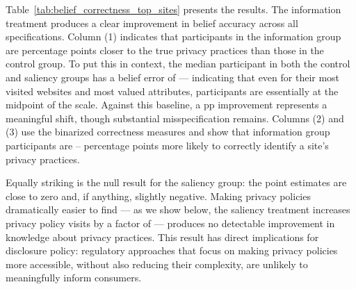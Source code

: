 \documentclass[12pt]{article}
\theoremstyle{definition}
\theoremstyle{remark}
\begin{document}
\begin{table}[ht]
   \caption{Belief Correctness on Top Sites -- Provided Information}\label{tab:belief_correctness_top_sites}
   \centering
   \scalebox{0.8}{
   
   }
   \caption*{\scriptsize \textsc{Notes}:  OLS estimates from Equation~\eqref{eq:belief_correctness}. Includes website and randomization block fixed effects. Column (1): Dependent variable is $|\text{Belief}_{ijk} - \text{Truth}_{jk}|$, where beliefs are scaled to $\{0, 25, 50, 75, 100\}$ and truth is binary $\{0, 100\}$. Column (2): Binary indicator equal to 1 if response is correct, excluding neutral responses of 50. Column (3): Strict correctness, equal to 1 if $(\text{Belief} > 50) = (\text{Truth} = 100)$. The beliefs are the likelihood of the website engaging in the specified privacy practice for the top 5 most visited sites during the intervention and for the top 2 most informative attributes according to Equation \eqref{eq:provided_info}.}
\end{table}

Table~\ref{tab:belief_correctness_top_sites} presents the results. The information treatment produces a clear improvement in belief accuracy across all specifications. Column (1) indicates that participants in the information group are \beliefDistanceInfoPP{} percentage points closer to the true privacy practices than those in the control group. To put this in context, the median participant in both the control and saliency groups has a belief error of \beliefErrorMedianBaseline{} --- indicating that even for their most visited websites and most valued attributes, participants are essentially at the midpoint of the scale. Against this baseline, a \beliefDistanceInfoPP{} pp improvement represents a meaningful shift, though substantial misspecification remains. Columns (2) and (3) use the binarized correctness measures and show that information group participants are \beliefCorrectStrictInfoPP{}--\beliefCorrectWeakInfoPP{} percentage points more likely to correctly identify a site's privacy practices.

Equally striking is the null result for the saliency group: the point estimates are close to zero and, if anything, slightly negative. Making privacy policies dramatically easier to find --- as we show below, the saliency treatment increases privacy policy visits by a factor of \policyVisitSaliencyFold{} --- produces no detectable improvement in knowledge about privacy practices. This result has direct implications for disclosure policy: regulatory approaches that focus on making privacy policies more accessible, without also reducing their complexity, are unlikely to meaningfully inform consumers.
 
\end{document}

